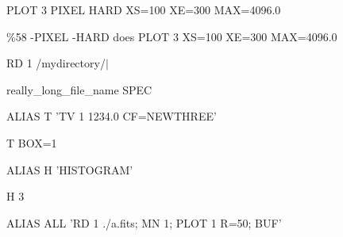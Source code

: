 {\newpage\clearpage
{}%
\begin{hanging}
  \item{PLOT 3 PIXEL HARD XS=100 XE=300 MAX=4096.0}
\end{hanging}%
\lthtmlfigureZ
\lthtmlcheckvsize\clearpage}

{\newpage\clearpage
{}%
\begin{example}
  \item[\%58 -PIXEL -HARD\hfill]{does PLOT 3 XS=100 XE=300 MAX=4096.0}
\end{example}%
\lthtmlfigureZ
\lthtmlcheckvsize\clearpage}

{\newpage\clearpage
{}%
\begin{hanging}
  \item{ RD 1 /mydirectory/$|$}
  \item{really\_long\_file\_name SPEC}
\end{hanging}%
\lthtmlfigureZ
\lthtmlcheckvsize\clearpage}

{\newpage\clearpage
{}%
\begin{hanging}
  \item{ALIAS T 'TV 1 1234.0 CF=NEWTHREE'}
\end{hanging}%
\lthtmlfigureZ
\lthtmlcheckvsize\clearpage}

{\newpage\clearpage
{}%
\begin{hanging}
  \item{T BOX=1}
\end{hanging}%
\lthtmlfigureZ
\lthtmlcheckvsize\clearpage}

{\newpage\clearpage
{}%
\begin{hanging}
  \item{ALIAS H 'HISTOGRAM'}
\end{hanging}%
\lthtmlfigureZ
\lthtmlcheckvsize\clearpage}

{\newpage\clearpage
{}%
\begin{hanging}
  \item{H 3\hfill}
\end{hanging}%
\lthtmlfigureZ
\lthtmlcheckvsize\clearpage}

{\newpage\clearpage
{}%
\begin{hanging}
  \item{ALIAS ALL 'RD 1 ./a.fits; MN 1; PLOT 1 R=50; BUF'}
\end{hanging}%
\lthtmlfigureZ
\lthtmlcheckvsize\clearpage}

